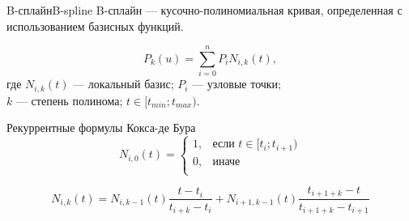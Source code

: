 \documentclass{beamer}
\begin{document}
	\begin{frame}{B-сплайн}{B-spline}
		B-сплайн  --- кусочно-полиномиальная кривая, определенная с использованием базисных функций.

		\[
			P_k(u) = \sum_{i=0}^{n} P_i N_{i, k} (t)
			,	
		\]
		где 
		$N_{i,k}(t)$ --- локальный базис;
		$P_i$ --- узловые точки;
		\\ $k$ --- степень полинома;
		$t \in  [t_{min}; t_{max})$.

		

		Рекуррентные формулы Кокса-де Бура %
		\[
		N_{i,0} (t) =
		\begin{cases}
			1, & \text{если~} t \in  [t_{i}; t_{i+1}) \\
			0, & \text{иначе} \\
		\end{cases}	
		\]

		\[
			N_{i,k} (t) =
			N_{i,k-1} (t)
			\frac{t - t_i}{t_{i+k} - t_i} 
			+
			N_{i+1,k-1} (t)
			\frac{t_{i+1+k} - t}{t_{i+1+k} - t_{i+1}} 
		\]


\end{frame}
\end{document}
